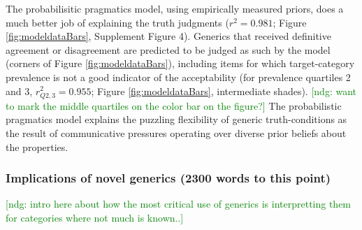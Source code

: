 \documentclass[10pt,letterpaper]{article}
\newcommand{\ndg}[1]{\textcolor{Green}{[ndg: #1]}}
\begin{document}

The probabilisitic pragmatics model, using empirically measured priors, does a much better job of explaining the truth judgments ($r^2=0.981$; Figure \ref{fig:modeldataBars}, Supplement Figure 4). 
Generics that received definitive agreement or disagreement are predicted to be judged as such by the model (corners of Figure \ref{fig:modeldataBars}), including items for which target-category prevalence is not a good indicator of the acceptability (for prevalence quartiles 2 and 3, $r_{Q2,3}^2=0.955$; Figure \ref{fig:modeldataBars}, intermediate shades). \ndg{want to mark the middle quartiles on the color bar on the figure?}
The probabilistic pragmatics model explains the puzzling flexibility of generic truth-conditions as the result of communicative pressures operating over diverse prior beliefs about the properties. 

\subsubsection*{Implications of novel generics (2300 words to this point)} 

\ndg{intro here about how the most critical use of generics is interpretting them for categories where not much is known..}
\end{document}
